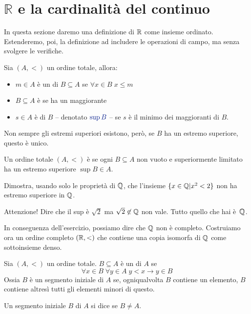 \section{\texorpdfstring{$\mathbb{R}$ e la cardinalit\`a del continuo}{R e la cardinalit\`a del continuo}}

In questa sezione daremo una definizione di $\mathbb R$ come insieme ordinato. Estenderemo, poi, la definizione ad includere le operazioni di campo, ma senza svolgere le verifiche.

\begin{definition}
	Sia $(A,<)$ un ordine totale, allora:
	\begin{itemize}
		\item $m \in A$ \`e un  di $B \subseteq A$ se $\forall {x \in B} \; x \leq m$
		\item $B \subseteq A$ \`e  se ha un maggiorante
		\item $s\in A$ \`e  di $B$ -- denotato $\drkblu \sup B$ -- se $s$ \`e il minimo dei maggioranti di $B$.
	\end{itemize}
\end{definition}

\begin{note}
	Non sempre gli estremi superiori esistono, per\`o, se $B$ ha un estremo superiore, questo \`e unico.
\end{note}

\begin{definition}
	Un ordine totale $(A,<)$ \`e  se ogni $B \subseteq A$ non vuoto e superiormente limitato ha un estremo superiore $\sup B \in A$.
\end{definition}

\begin{exercise}
	\label{q_noncompleto}
	Dimostra, usando solo le propriet\`a di $\mathbb Q$, che l'insieme $\{x
\in \mathbb Q | x^2 < 2\}$ non ha estremo superiore in $\mathbb Q$.

{\drkred Attenzione!} Dire che il sup \`e $\sqrt 2$ ma $\sqrt 2\not\in\mathbb Q$ non
vale. Tutto quello che hai \`e~$\mathbb Q$.
\end{exercise}

In conseguenza dell'esercizio, possiamo dire che $\mathbb Q$ non \`e completo. Costruiamo ora un ordine completo $(\mathbb R,<)$ che contiene una copia isomorfa di $\mathbb Q$ come sottoinsieme denso.

\begin{definition}
	Sia $(A,<)$ un ordine totale. $B \subseteq A$ \`e un
 di $A$ se
\[\forall {x \in B} \; \forall {y \in
A} \; y < x \rightarrow y \in B\]
{\drkgrn Ossia $B$ \`e un segmento iniziale di $A$ se, ogniqualvolta $B$
contiene un elemento, $B$ contiene altres\`i tutti gli elementi minori di
questo.}

Un segmento iniziale $B$ di $A$ si dice  se $B \ne A$.
\end{definition}

